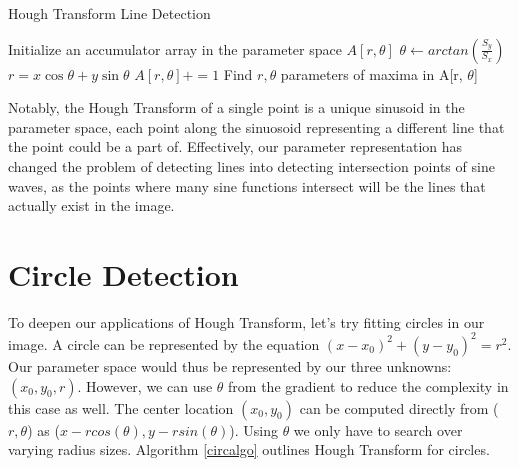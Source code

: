 \documentclass{article}
\begin{document}
\begin{algorithm}
\caption{Hough Transform Line Detection}
\label{linealgo}
\begin{algorithmic}
        \State Initialize an accumulator array in the parameter space \begin{math}A[r,\theta]\end{math}
            \State $\theta \gets arctan(\frac{S_y}{S_x})$
            \State $r = x\cos{\theta}+y\sin{\theta}$
            \State \begin{math}A[r,\theta] += 1\end{math}
        \EndFor
        \State Find $r,\theta$ parameters of maxima in A[r, $\theta$]
        \\
\EndFunction
\end{algorithmic}
\end{algorithm}

\noindent
Notably, the Hough Transform of a single point is a unique sinusoid in the parameter space, each point along the sinuosoid representing a different line that the point could be a part of. Effectively, our parameter representation has changed the problem of detecting lines into detecting intersection points of sine waves, as the points where many sine functions intersect will be the lines that actually exist in the image. 

\section{Circle Detection}
To deepen our applications of Hough Transform, let's try fitting circles in our image. A circle can be represented by the equation \begin{math}(x-x_0)^2+(y-y_0)^2=r^2\end{math}. Our parameter space would thus be represented by our three unknowns: \begin{math}(x_0,y_0,r)\end{math}. However, we can use $\theta$ from the gradient to reduce the complexity in this case as well. The center location $(x_0,y_0)$ can be computed directly from ($r, \theta$) as ($x-rcos(\theta), y-rsin(\theta)$). Using $\theta$ we only have to search over varying radius sizes. Algorithm \ref{circalgo} outlines Hough Transform for circles.
\end{document}
